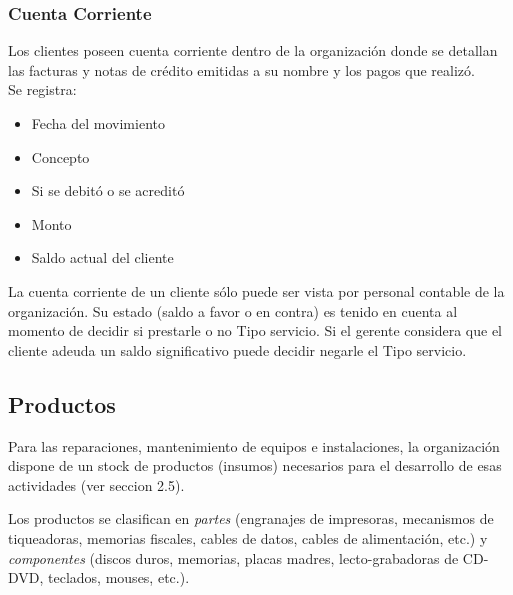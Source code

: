 \documentclass[12pt]{extarticle}
\begin{document}
\begin{spacing}{1.2}
    \subsubsection{Cuenta Corriente}
        Los clientes poseen cuenta corriente dentro de la organización donde se detallan las facturas y notas de crédito emitidas a su nombre y los pagos que realizó.\\
        Se registra:
        \begin{itemize}
            \item Fecha del movimiento
            \item Concepto
            \item Si se debitó o se acreditó
            \item Monto
            \item Saldo actual del cliente
        \end{itemize}

        La cuenta corriente de un cliente sólo puede ser vista por personal contable de la organización. Su estado (saldo a favor o en contra) es tenido en cuenta al momento de decidir si prestarle o no Tipo servicio. Si el gerente considera que el cliente adeuda un saldo significativo puede decidir negarle el Tipo servicio.

    \pagebreak
    \subsection{Productos}
        Para las reparaciones, mantenimiento de equipos e instalaciones, la organización dispone de un stock de productos (insumos) necesarios para el desarrollo de esas actividades (ver seccion 2.5).
    
        Los productos se clasifican en \textit{partes} (engranajes de impresoras, mecanismos de tiqueadoras, memorias fiscales, cables de datos, cables de alimentación, etc.) y \textit{componentes} (discos duros, memorias, placas madres, lecto-grabadoras de CD-DVD, teclados, mouses, etc.).\\


\end{spacing}
\end{document}
